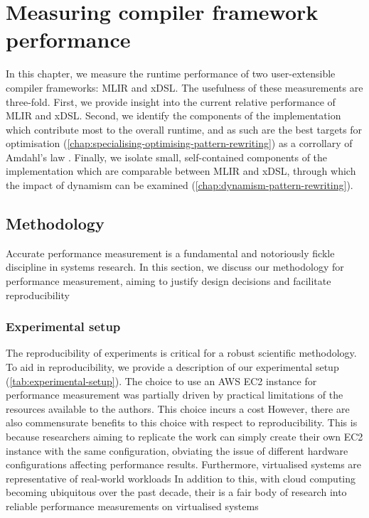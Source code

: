 \chapter{Measuring compiler framework performance}
\label{chap:measuring-compiler-performance}

In this chapter, we measure the runtime performance of two user-extensible compiler frameworks: MLIR and xDSL.
The usefulness of these measurements are three-fold. First, we provide insight into the current relative performance of MLIR and xDSL. %
Second, we identify the components of the implementation which contribute most to the overall runtime, and as such are the best targets for optimisation (\autoref{chap:specialising-optimising-pattern-rewriting}) as a corrollary of Amdahl's law \cite{amdahlValiditySingleProcessor1967}.
Finally, we isolate small, self-contained components of the implementation which are comparable between MLIR and xDSL, through which the impact of dynamism can be examined (\autoref{chap:dynamism-pattern-rewriting}).





\section{Methodology}
\label{sec:methodology}

Accurate performance measurement is a fundamental and notoriously fickle discipline in systems research. %
In this section, we discuss our methodology for performance measurement, aiming to justify design decisions and facilitate reproducibility

\subsection{Experimental setup}
\label{ssec:experimental-setup}

The reproducibility of experiments is critical for a robust scientific methodology.
To aid in reproducibility, we provide a description of our experimental setup (\autoref{tab:experimental-setup}).
The choice to use an AWS EC2 instance for performance measurement was partially driven by practical limitations of the resources available to the authors.
This choice incurs a cost
However, there are also commensurate benefits to this choice with respect to reproducibility. This is because researchers aiming to replicate the work can simply create their own EC2 instance with the same configuration, obviating the issue of different hardware configurations affecting performance results.
Furthermore, virtualised systems are representative of real-world workloads
In addition to this, with cloud computing becoming ubiquitous over the past decade, their is a fair body of research into reliable performance measurements on virtualised systems

